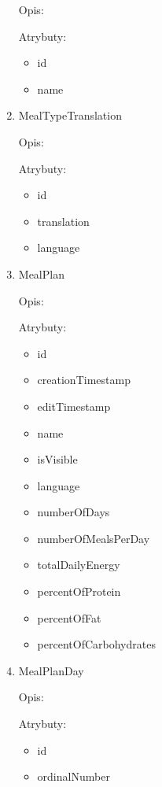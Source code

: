 \begin{enumerate}[label={\textbf{KAT/\protect\threedigits{\theenumi}}}, wide, labelwidth=!, labelindent=0pt]
    Opis: \lipsum[1]
    \par
    Atrybuty:
    \begin{itemize}
        \item id
        \item name
    \end{itemize}

    \item \label{kat:MealTypeTranslation} MealTypeTranslation

    Opis: \lipsum[1]
    \par
    Atrybuty:
    \begin{itemize}
        \item id
        \item translation
        \item language
    \end{itemize}


    \item \label{kat:MealPlan} MealPlan

    Opis: \lipsum[1]
    \par
    Atrybuty:
    \begin{itemize}
        \item id
        \item creationTimestamp
        \item editTimestamp
        \item name
        \item isVisible
        \item language
        \item numberOfDays
        \item numberOfMealsPerDay
        \item totalDailyEnergy
        \item percentOfProtein
        \item percentOfFat
        \item percentOfCarbohydrates
    \end{itemize}

    \item \label{kat:MealPlanDay} MealPlanDay

    Opis: \lipsum[1]
    \par
    Atrybuty:
    \begin{itemize}
        \item id
        \item ordinalNumber
    \end{itemize}


\end{enumerate}
